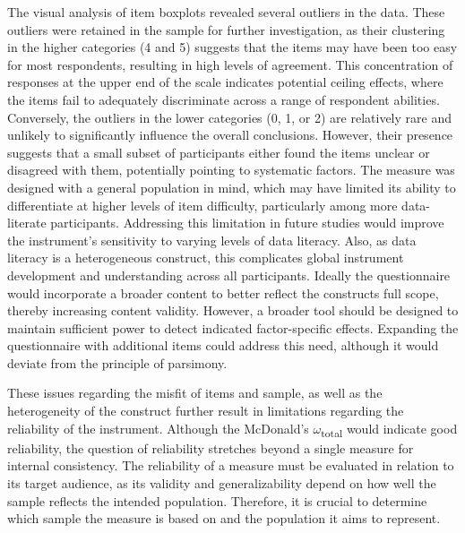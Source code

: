 \documentclass[
  12pt,
  a4paper,
  twoside]{article}
\begin{document}
The visual analysis of item boxplots revealed several outliers in the data. These outliers were retained in the sample for further investigation, as their clustering in the higher categories (4 and 5) suggests that the items may have been too easy for most respondents, resulting in high levels of agreement. This concentration of responses at the upper end of the scale indicates potential ceiling effects, where the items fail to adequately discriminate across a range of respondent abilities. Conversely, the outliers in the lower categories (0, 1, or 2) are relatively rare and unlikely to significantly influence the overall conclusions. However, their presence suggests that a small subset of participants either found the items unclear or disagreed with them, potentially pointing to systematic factors.
The measure was designed with a general population in mind, which may have limited its ability to differentiate at higher levels of item difficulty, particularly among more data-literate participants. Addressing this limitation in future studies would improve the instrument's sensitivity to varying levels of data literacy.
Also, as data literacy is a heterogeneous construct, this complicates global instrument development and understanding across all participants. Ideally the questionnaire would incorporate a broader content to better reflect the constructs full scope, thereby increasing content validity.
However, a broader tool should be designed to maintain sufficient power to detect indicated factor-specific effects.
Expanding the questionnaire with additional items could address this need, although it would deviate from the principle of parsimony.

These issues regarding the misfit of items and sample, as well as the heterogeneity of the construct further result in limitations regarding the reliability of the instrument. Although the McDonald's \(\omega\)\textsubscript{total} would indicate good reliability, the question of reliability stretches beyond a single measure for internal consistency.
The reliability of a measure must be evaluated in relation to its target audience, as its validity and generalizability depend on how well the sample reflects the intended population.
Therefore, it is crucial to determine which sample the measure is based on and the population it aims to represent.
\end{document}
